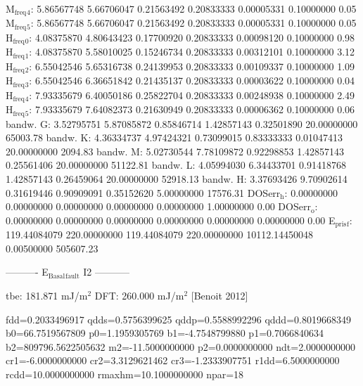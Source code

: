 \documentclass[11pt]{article}
\begin{document}
M\(_{\text{freq}}\)\(_{\text{4}}\):   5.86567748   5.66706047   0.21563492   0.20833333   0.00005331   0.10000000         0.05
M\(_{\text{freq}}\)\(_{\text{5}}\):   5.86567748   5.66706047   0.21563492   0.20833333   0.00005331   0.10000000         0.05
H\(_{\text{freq}}\)\(_{\text{0}}\):   4.08375870   4.80643423   0.17700920   0.20833333   0.00098120   0.10000000         0.98
H\(_{\text{freq}}\)\(_{\text{1}}\):   4.08375870   5.58010025   0.15246734   0.20833333   0.00312101   0.10000000         3.12
H\(_{\text{freq}}\)\(_{\text{2}}\):   6.55042546   5.65316738   0.24139953   0.20833333   0.00109337   0.10000000         1.09
H\(_{\text{freq}}\)\(_{\text{3}}\):   6.55042546   6.36651842   0.21435137   0.20833333   0.00003622   0.10000000         0.04
H\(_{\text{freq}}\)\(_{\text{4}}\):   7.93335679   6.40050186   0.25822704   0.20833333   0.00248938   0.10000000         2.49
H\(_{\text{freq}}\)\(_{\text{5}}\):   7.93335679   7.64082373   0.21630949   0.20833333   0.00006362   0.10000000         0.06
bandw. G:   3.52795751   5.87085872   0.85846714   1.42857143   0.32501890  20.00000000     65003.78
bandw. K:   4.36334737   4.97424321   0.73099015   0.83333333   0.01047413  20.00000000      2094.83
bandw. M:   5.02730544   7.78109872   0.92298853   1.42857143   0.25561406  20.00000000     51122.81
bandw. L:   4.05994030   6.34433701   0.91418768   1.42857143   0.26459064  20.00000000     52918.13
bandw. H:   3.37693426   9.70902614   0.31619446   0.90909091   0.35152620   5.00000000     17576.31
DOSerr\(_{\text{h}}\):   0.00000000   0.00000000   0.00000000   0.00000000   0.00000000   1.00000000         0.00
DOSerr\(_{\text{o}}\):   0.00000000   0.00000000   0.00000000   0.00000000   0.00000000   0.00000000         0.00
E\(_{\text{pris}}\)\(_{\text{f}}\): 119.44084079 220.00000000 119.44084079 220.00000000 10112.14450048   0.00500000    505607.23


----------     E\(_{\text{Basal}}\)\(_{\text{fault}}\) I2     -----------

tbe:       181.871 mJ/m\(^{\text{2}}\)
DFT:       260.000 mJ/m\(^{\text{2}}\) [Benoit  2012]



fdd=0.2033496917 qdds=0.5756399625 qddp=0.5588992296 qddd=0.8019668349 b0=66.7519567809 p0=1.1959305769 b1=-4.7548799880 p1=0.7066840634 b2=809796.5622505632 m2=-11.5000000000 p2=0.0000000000 ndt=2.0000000000 cr1=-6.0000000000 cr2=3.3129621462 cr3=-1.2333907751 r1dd=6.5000000000 rcdd=10.0000000000 rmaxhm=10.1000000000 npar=18 
\end{document}
